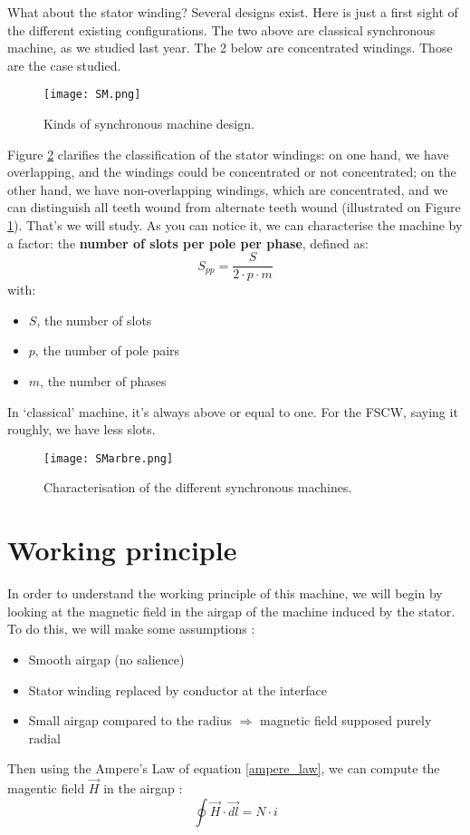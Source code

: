 What about the stator winding? Several designs exist. Here is just a first sight of the different existing configurations. The two above are classical synchronous machine, as we studied last year. The 2 below are concentrated windings. Those are the case studied.

\begin{figure}[H]
    \centering
    \texttt{[image: SM.png]}
    \caption{Kinds of synchronous machine design.}
    \label{fig:SM}
\end{figure}

Figure \ref{fig:SMarbre} clarifies the classification of the stator windings: on one hand, we have overlapping, and the windings could be concentrated or not concentrated; on the other hand, we have non-overlapping windings, which are concentrated, and we can distinguish all teeth wound from alternate teeth wound (illustrated on Figure \ref{fig:SM}). That’s we will study. As you can notice it, we can characterise the machine by a factor: the \textbf{number of slots per pole per phase}, defined as:
\begin{equation}
    S_{pp} = \frac{S}{2 \cdot p \cdot m}
\end{equation}
with:
\begin{itemize}
    \item $S$, the number of slots
    \item $p$, the number of pole pairs
    \item $m$, the number of phases 
\end{itemize}
In ‘classical’ machine, it’s always above or equal to one. For the FSCW, saying it roughly, we have less slots.  

\begin{figure}[H]
    \centering
    \texttt{[image: SMarbre.png]}
    \caption{Characterisation of the different synchronous machines.}
    \label{fig:SMarbre}
\end{figure}


\section{Working principle}
In order to understand the working principle of this machine, we will begin by looking at the magnetic field in the airgap of the machine induced by the stator. To do this, we will make some assumptions :
\begin{itemize}
    \item Smooth airgap (no salience)
    \item Stator winding replaced by conductor at the interface
    \item Small airgap compared to the radius $\Rightarrow$ magnetic field supposed purely radial
\end{itemize}
Then using the Ampere's Law of equation \ref{ampere_law}, we can compute the magentic field $\vec{H}$ in the airgap :
\begin{equation} \label{ampere_law}
    \oint \vec{H} \cdot \vec{dl} = N \cdot i
\end{equation}

